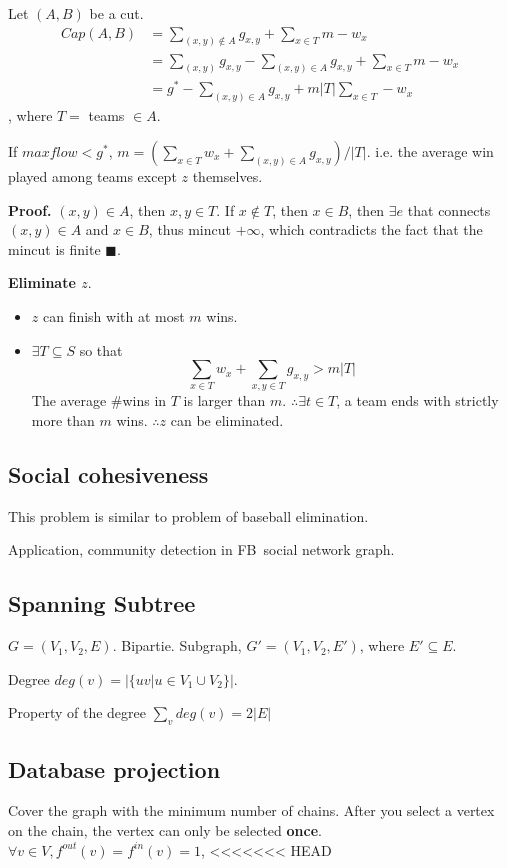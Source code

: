 \documentclass[a4paper]{report}
\theoremstyle{definition}
\begin{document}
Let $(A, B)$ be a cut.
\begin{align*}
Cap(A, B) &= \sum_{(x,y)\notin A} g_{x,y}+\sum_{x\in T} m-w_x\\
&= \sum_{(x,y)}g_{x, y}-\sum_{(x, y)\in A} g_{x, y}+\sum_{x\in T}m-w_x\\
&= g^*-\sum_{(x, y)\in A} g_{x, y}+m|T|\sum_{x\in T}-w_x
\end{align*}
, where $T=$ teams $\in A$.

If $maxflow <g^*$, $m=(\sum_{x\in T} w_x+\sum_{(x,y)\in A} g_{x,y})/|T|$. i.e. the average win played among teams except $z$ themselves.

\textbf{Proof.} $(x,y)\in A$, then $x, y\in T$. If $x \notin T$, then $x \in B$, then $\exists e$ that connects $(x,y)\in A$ and $x\in B$, thus mincut $+\infty$, which contradicts the fact that the mincut is finite $\blacksquare$.

\textbf{Eliminate $z$}.
\begin{itemize}
\item $z$ can finish with at most $m$ wins.
\item $\exists T\subseteq S$ so that
$$
\sum_{x\in T} w_x + \sum_{x, y \in T} g_{x, y} > m|T|
$$
The average \#wins in $T$ is larger than $m$. $\therefore \exists t \in T$, a team ends with strictly more than $m$ wins. $\therefore z$  can be eliminated.
\end{itemize}

\subsection{Social cohesiveness}
This problem is similar to problem of baseball elimination.

Application, community detection in FB\ social network graph.

\subsection{Spanning Subtree}
$G=(V_1, V_2, E)$. Bipartie. Subgraph, $G'=(V_1, V_2, E')$, where $E'\subseteq E$.

Degree $deg(v)=|\{uv|u\in V_1\cup V_2\}|$.

Property of the degree $\sum_v deg(v)=2|E|$

\subsection{Database projection}
Cover the graph with the minimum number of chains. After you select a vertex on the chain, the vertex can only be selected \textbf{once}. $\forall v\in V, f^{out}(v)=f^{in}(v)=1$,
<<<<<<< HEAD
\end{document}
